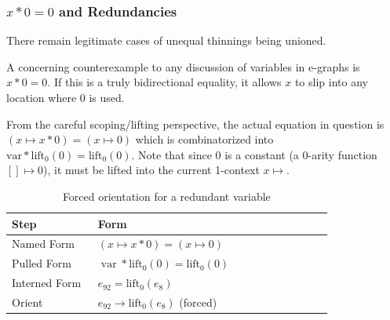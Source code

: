 \documentclass{article}%
\newcommand{\lift}{\text{lift}}
\begin{document}
\subsubsection{$x * 0 = 0$ and Redundancies}

There remain legitimate cases of unequal thinnings being unioned.

A concerning counterexample to any discussion of variables in e-graphs is $x * 0 = 0$. If this is a truly bidirectional equality, it allows $x$ to slip into any location where $0$ is used. 

From the careful scoping/lifting perspective, the actual equation in question is $(x \mapsto x * 0) = (x \mapsto 0)$ which is combinatorized into $\text{var} * \lift_0(0) = \lift_0(0)$. Note that since $0$ is a constant (a 0-arity function $[] \mapsto 0$), it must be lifted into the current 1-context $x \mapsto$.







\begin{table}[htbp]
\centering
\small
\renewcommand{\arraystretch}{1.4}
\begin{tabular}{p{0.25\linewidth}p{0.68\linewidth}}
\hline
Step & Form \\
\hline
Named Form
&
$(x \mapsto x * 0) = (x \mapsto 0)$
\\
Pulled Form
&
$\operatorname{var} * \lift_0(0) = \lift_0(0)$
\\
Interned Form
&
$e_{92} = \lift_0(e_8)$
\\
Orient
&
$e_{92} \rightarrow \lift_0(e_8)$ (forced)
\\
\hline
\end{tabular}
\caption{Forced orientation for a redundant variable}
\label{tab:forced-orientation}
\end{table}
\end{document}
